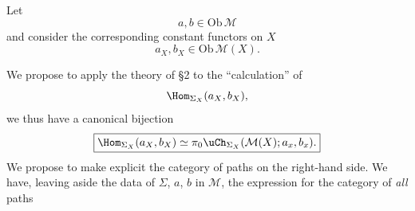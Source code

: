 Let
\[
a, b \in \mathrm{Ob}\,\mathcal{M}
\]
and consider the corresponding constant functors on $X$
\[
a_X, b_X \in \mathrm{Ob}\,\mathcal{M}(X).
\]

We propose to apply the theory of \S2 to the ``calculation'' of
\[
\Hom_{\Sigma_X}(a_X, b_X),
\]
we thus have a canonical bijection
\[
\boxed{\Hom_{\Sigma_X}(a_X, b_X) \simeq \pi_0\uCh_{\Sigma_X}(\mathcal{M}(X); a_x, b_x).} %
\]
We propose to make explicit the category of paths on the right-hand side. We have, leaving aside the data of $\Sigma$, $a$, $b$ in $\mathcal{M}$, the expression for the category of \textit{all} paths
